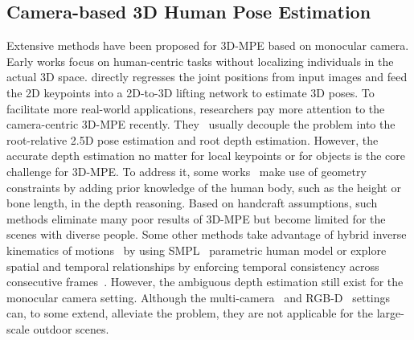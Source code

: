 \documentclass[letterpaper]{article} %
\begin{document}
\subsection{Camera-based 3D Human Pose Estimation}
Extensive methods have been proposed for 3D-MPE based on monocular camera. Early works focus
on human-centric tasks without localizing individuals in the actual 3D space. \cite{pavlakos2017coarse} directly regresses the joint positions from input images and \cite{tome2017lifting,martinez2017simple,rogez2019lcr} feed the 2D keypoints into a 2D-to-3D lifting network to estimate 3D poses. To facilitate more real-world applications, researchers pay more attention to the camera-centric 3D-MPE recently. They~\cite{moon2019camera,veges2019absolute,wang2020hmor} usually decouple the problem into the root-relative 2.5D pose estimation and root depth estimation. However, the accurate depth estimation no matter for local keypoints or for objects is the core challenge for 3D-MPE. To address it, some works~\cite{mehta2018single,mehta2020xnect,zhen2020smap,zhang2022mutual} make use of geometry constraints by adding prior knowledge of the human body, such as the height or bone length, in the depth reasoning. 
Based on handcraft assumptions, such methods eliminate many poor results of 3D-MPE but become limited for the scenes with diverse people. Some other methods take advantage of hybrid inverse kinematics of motions~\cite{sun2021monocular,li2021hybrik,sun2022putting,yu2021skeleton2mesh} by using SMPL~\cite{loper2015smpl} parametric human model or explore spatial and temporal relationships by enforcing temporal consistency across consecutive frames~\cite{temporal-arnab2019exploiting,temporal-cheng20203d,temporal-zheng20213d,temporal-zhang2022mixste}. However, the ambiguous depth estimation still exist for the monocular camera setting. Although the multi-camera~\cite{dong2019fast,zhang2021direct,rhodin2018unsupervised,chen2019unsupervised,kocabas2019self,wandt2021canonpose} and RGB-D~\cite{mehta2017vnect,zimmermann20183d,ying2021rgb} settings can, to some extend, alleviate the problem, they are not applicable for the large-scale outdoor scenes.
\end{document}
